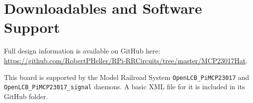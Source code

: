 \section{Downloadables and Software Support}

Full design information is available on GitHub here:
\url{https://github.com/RobertPHeller/RPi-RRCircuits/tree/master/MCP23017Hat}.

This board is supported by the Model Railroad System
\texttt{OpenLCB\_PiMCP23017} and \texttt{OpenLCB\_PiMCP23017\_signal} daemons.
A basic XML file for it is included in its GitHub folder. 


